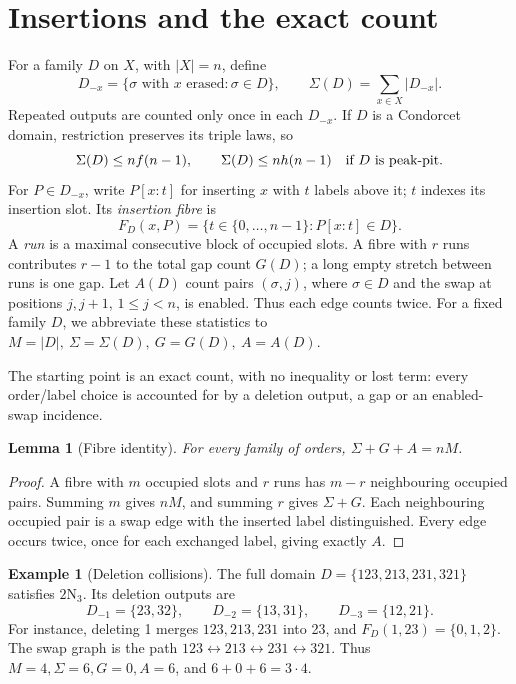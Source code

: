 \documentclass[11pt,letterpaper]{article}
\newtheorem{lemma}[theorem]{Lemma}
\theoremstyle{definition}
\newtheorem{example}[theorem]{Example}
\newcommand{\Sig}{\Sigma}
\newcommand{\N}[2]{#1\mathrm N_{#2}}
\begin{document}
\clearpage
\section{Insertions and the exact count}\label{sec:fibres}
For a family \(D\) on \(X\), with \(|X|=n\), define
\[
 D_{-x}=\{\sigma\text{ with }x\text{ erased}:\sigma\in D\},
 \qquad\Sig(D)=\sum_{x\in X}|D_{-x}|.
\]
Repeated outputs are counted only once in each \(D_{-x}\).
If \(D\) is a Condorcet domain, restriction preserves its triple laws, so
\begin{equation}\label{eq:deleteupper}
 \Sig(D)\leq nf(n-1),\qquad
 \Sig(D)\leq nh(n-1)\quad\hbox{if \(D\) is peak-pit}.
\end{equation}
For \(P\in D_{-x}\), write \(P[x:t]\) for inserting \(x\) with
\(t\) labels above it; \(t\) indexes its insertion slot. Its \emph{insertion fibre} is
\[
 F_D(x,P)=\{t\in\{0,\ldots,n-1\}:P[x:t]\in D\}.
\]
A \emph{run} is a maximal consecutive block of occupied slots.
A fibre with \(r\) runs contributes \(r-1\) to the total gap count
\(G(D)\); a long empty stretch between runs is one gap.
Let \(A(D)\) count pairs \((\sigma,j)\), where \(\sigma\in D\) and
the swap at positions \(j,j+1\), \(1\leq j<n\), is enabled.
Thus each edge counts twice. For a fixed family \(D\),
we abbreviate these statistics to
\(M=|D|,\ \Sig=\Sig(D),\ G=G(D),\ A=A(D)\).

The starting point is an exact count, with no inequality or lost term:
every order/label choice is accounted for by a deletion output, a gap
or an enabled-swap incidence.
\begin{lemma}[Fibre identity]\label{lem:fibre}
For every family of orders,
\(\boxed{\Sig+G+A=nM}\).
\end{lemma}
\begin{proof}
A fibre with \(m\) occupied slots and \(r\) runs has \(m-r\)
neighbouring occupied pairs. Summing \(m\) gives \(nM\), and summing
\(r\) gives \(\Sig+G\). Each neighbouring occupied pair is a swap
edge with the inserted label distinguished. Every edge occurs twice,
once for each exchanged label, giving exactly \(A\).
\end{proof}

\begin{example}[Deletion collisions]\label{ex:four}
The full domain \(D=\{123,213,231,321\}\) satisfies \(\N23\).
Its deletion outputs are
\[
 D_{-1}=\{23,32\},\qquad D_{-2}=\{13,31\},\qquad
 D_{-3}=\{12,21\}.
\]
For instance, deleting 1 merges \(123,213,231\) into 23, and
\(F_D(1,23)=\{0,1,2\}\). The swap graph is the path
\(123\leftrightarrow213\leftrightarrow231\leftrightarrow321\).
Thus \(M=4,\Sig=6,G=0,A=6\), and \(6+0+6=3\cdot4\).
\end{example}
\end{document}
